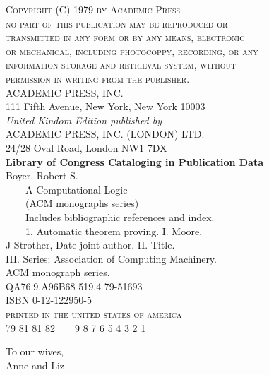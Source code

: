 \documentclass[11pt]{book}
\begin{document}
\begin{flushleft}\textsc{Copyright (C) 1979 by Academic Press\\
no part of this publication may be reproduced or\\
transmitted in any form or by any means, electronic\\
or mechanical, including photocoppy, recording, or any\\
information storage and retrieval system, without\\
permission in writing from the publisher.}\\
\vspace{2\baselineskip} ACADEMIC PRESS, INC.\\
\small 111 Fifth Avenue, New York, New York 10003\normalsize\\
\vspace{2\baselineskip} \emph{United Kindom Edition published by}\\
ACADEMIC PRESS, INC. (LONDON) LTD.\\
\small 24/28 Oval Road, London NW1  7DX\normalsize\\
\vspace{2\baselineskip}\small\textbf{Library of Congress Cataloging in Publication Data}\\
\vspace{\baselineskip}
Boyer, Robert S.\\
~~~~A Computational Logic\\
\vspace{\baselineskip}
~~~~(ACM monographs series)\\
~~~~Includes bibliographic references and index.\\
~~~~1.  Automatic theorem proving.   I.  Moore,\\
J Strother, Date       joint author. II. Title.\\
III. Series:   Association of Computing Machinery.\\
ACM monograph series.\\
QA76.9.A96B68    519.4   79-51693\\
ISBN 0-12-122950-5\\
\vspace{2\baselineskip}\textsc{printed in the united states of america}\\
\vspace{\baselineskip}\footnotesize 79 81 81 82\ \ \ \ 9 8 7 6 5 4 3 2 1\normalsize\end{flushleft}
\cleardoublepage\thispagestyle{empty}\vspace*{1.2in}\Large\begin{flushleft}To our wives,\\
\vspace{.5\baselineskip}Anne and Liz\end{flushleft}
\newpage \thispagestyle{empty} \newpage\thispagestyle{empty}
\tableofcontents
\end{document}
